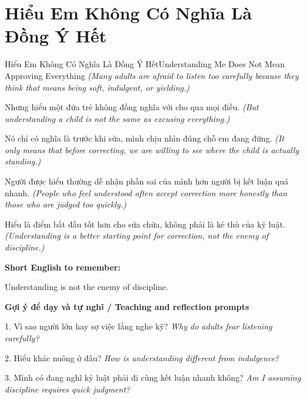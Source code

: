 \section{Hiểu Em Không Có Nghĩa Là Đồng Ý Hết}
\begin{truyen}{Hiểu Em Không Có Nghĩa Là Đồng Ý Hết}{Understanding Me Does Not Mean Approving Everything}
\textit{(Many adults are afraid to listen too carefully because they think that means being soft, indulgent, or yielding.)}

Nhưng hiểu một đứa trẻ không đồng nghĩa với cho qua mọi điều.
\textit{(But understanding a child is not the same as excusing everything.)}

Nó chỉ có nghĩa là trước khi sửa, mình chịu nhìn đúng chỗ em đang đứng.
\textit{(It only means that before correcting, we are willing to see where the child is actually standing.)}

Người được hiểu thường dễ nhận phần sai của mình hơn người bị kết luận quá nhanh.
\textit{(People who feel understood often accept correction more honestly than those who are judged too quickly.)}

\end{truyen}

\begin{baihoc}
Hiểu là điểm bắt đầu tốt hơn cho sửa chữa, không phải là kẻ thù của kỷ luật.
\textit{(Understanding is a better starting point for correction, not the enemy of discipline.)}
\end{baihoc}

\begin{ghinhoanh}
\textbf{Short English to remember:}

Understanding is not the enemy of discipline.

\end{ghinhoanh}

\begin{tuhocnhanh}
\textbf{Gợi ý để dạy và tự nghĩ / Teaching and reflection prompts}

1. Vì sao người lớn hay sợ việc lắng nghe kỹ? \textit{Why do adults fear listening carefully?}

2. Hiểu khác nuông ở đâu? \textit{How is understanding different from indulgence?}

3. Mình có đang nghĩ kỷ luật phải đi cùng kết luận nhanh không? \textit{Am I assuming discipline requires quick judgment?}
\end{tuhocnhanh}
\ngancach

